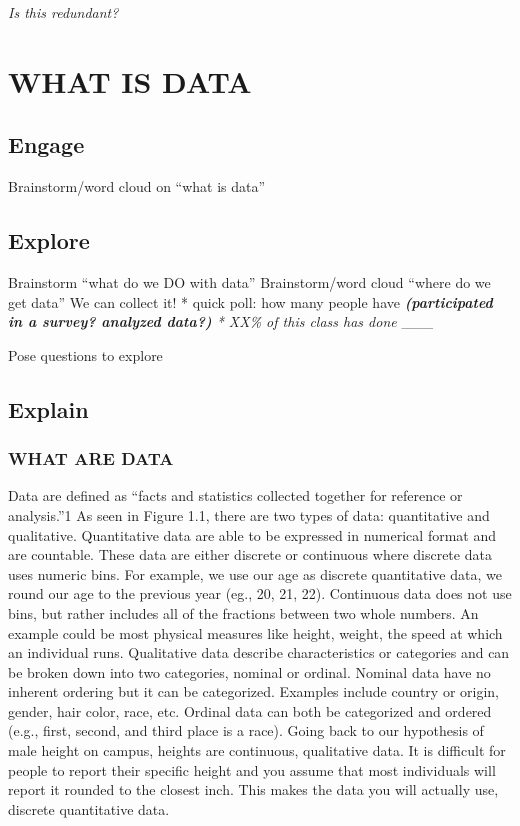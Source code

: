 \documentclass[
]{book}
\begin{document}
\emph{Is this redundant?}

\hypertarget{what-is-data}{%
\chapter{WHAT IS DATA}\label{what-is-data}}

\hypertarget{engage}{%
\section{Engage}\label{engage}}

Brainstorm/word cloud on ``what is data''

\hypertarget{explore}{%
\section{Explore}\label{explore}}

Brainstorm ``what do we DO with data''
Brainstorm/word cloud ``where do we get data''
We can collect it!
* quick poll: how many people have \emph{\textbf{(participated in a survey? analyzed data?)}
* XX\% of this class has done }\_\_\_

Pose questions to explore

\hypertarget{explain}{%
\section{Explain}\label{explain}}

\hypertarget{what-are-data}{%
\subsection{WHAT ARE DATA}\label{what-are-data}}

Data are defined as ``facts and statistics collected together for reference or analysis.''1 As seen in Figure 1.1, there are two types of data: quantitative and qualitative. Quantitative data are able to be expressed in numerical format and are countable. These data are either discrete or continuous where discrete data uses numeric bins. For example, we use our age as discrete quantitative data, we round our age to the previous year (eg., 20, 21, 22). Continuous data does not use bins, but rather includes all of the fractions between two whole numbers. An example could be most physical measures like height, weight, the speed at which an individual runs.
Qualitative data describe characteristics or categories and can be broken down into two categories, nominal or ordinal. Nominal data have no inherent ordering but it can be categorized. Examples include country or origin, gender, hair color, race, etc. Ordinal data can both be categorized and ordered (e.g., first, second, and third place is a race).
Going back to our hypothesis of male height on campus, heights are continuous, qualitative data. It is difficult for people to report their specific height and you assume that most individuals will report it rounded to the closest inch. This makes the data you will actually use, discrete quantitative data.
\end{document}
